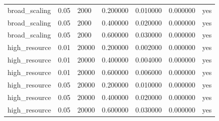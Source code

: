 \begin{tabular}{lllllll}
broad\_scaling & 0.05 & 2000 & 0.200000 & 0.010000 & 0.000000 & yes \\
broad\_scaling & 0.05 & 2000 & 0.400000 & 0.020000 & 0.000000 & yes \\
broad\_scaling & 0.05 & 2000 & 0.600000 & 0.030000 & 0.000000 & yes \\
high\_resource & 0.01 & 20000 & 0.200000 & 0.002000 & 0.000000 & yes \\
high\_resource & 0.01 & 20000 & 0.400000 & 0.004000 & 0.000000 & yes \\
high\_resource & 0.01 & 20000 & 0.600000 & 0.006000 & 0.000000 & yes \\
high\_resource & 0.05 & 20000 & 0.200000 & 0.010000 & 0.000000 & yes \\
high\_resource & 0.05 & 20000 & 0.400000 & 0.020000 & 0.000000 & yes \\
high\_resource & 0.05 & 20000 & 0.600000 & 0.030000 & 0.000000 & yes \\
\bottomrule
\end{tabular}

